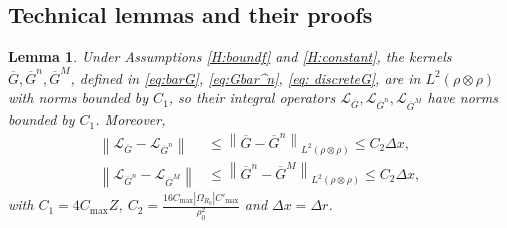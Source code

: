 \documentclass[12pt]{article}
\def\Gbar{ {\overline{G}} }
\def\LGbar{ {\mathcal{L}_{\overline{G}}}  }
\newtheorem{lemma}[theorem]{Lemma}
\numberwithin{equation}{section}
\numberwithin{theorem}{section}
\begin{document}
\subsection{Technical lemmas and their proofs}
\begin{lemma} \label{Lem: HSoperator}
Under Assumptions \ref{H:boundf} and \ref{H:constant}, the kernels $\Gbar, \Gbar^n, \Gbar^M$, defined in \eqref{eq:barG}, \eqref{eq:Gbar^n}, \eqref{eq: discreteG}, are in $L^2(\rho \otimes \rho)$ with norms bounded by $C_1$, so their integral operators $\LGbar,\mathcal{L}_{\Gbar^n},\mathcal{L}_{\Gbar^M} $ have norms bounded by $C_1$. 
Moreover,
\begin{align}
\left\|\mathcal{L}_{\Gbar}-\mathcal{L}_{\Gbar^n}\right\| & \leq\left\|\Gbar-\Gbar^n\right\|_{L^2(\rho \otimes \rho)} \leq C_2 \Delta x,\\
\left\|\mathcal{L}_{\Gbar^n}- \mathcal{L}_{\Gbar^M} \right\| & \leq\left\|\Gbar^n-\Gbar^M\right\|_{L^2(\rho \otimes \rho)} \leq C_2 \Delta x,
\end{align}
with $C_1=4 C_{\max }Z$, $C_2=\frac{16 C_{\max }\left|\Omega_{R_0}\right| C'_{\max}}{\rho_0^2}$ and $\Delta x  = \Delta r$.
\end{lemma}
\end{document}
